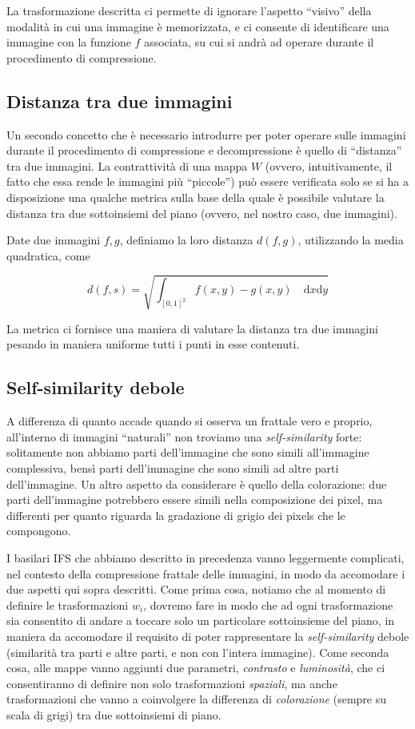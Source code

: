 \documentclass[11pt,a4paper,appendixprefix=true,numbers=noenddot]{scrreprt}
\begin{document}
La trasformazione descritta ci permette di ignorare l'aspetto ``visivo'' della modalità in cui una immagine è memorizzata, e ci consente di identificare una immagine con la funzione $f$ associata, su cui si andrà ad operare durante il procedimento di compressione.

\subsection*{Distanza tra due immagini}

Un secondo concetto che è necessario introdurre per poter operare sulle immagini durante il procedimento di compressione e decompressione è quello di ``distanza'' tra due immagini. La contrattività di una mappa $W$ (ovvero, intuitivamente, il fatto che essa rende le immagini più ``piccole'') può essere verificata solo se si ha a disposizione una qualche metrica sulla base della quale è possibile valutare la distanza tra due sottoinsiemi del piano (ovvero, nel nostro caso, due immagini).

Date due immagini $f, g$, definiamo la loro distanza $d(f, g)$, utilizzando la media quadratica, come

\[
d(f,s) = \sqrt{\int_{[0,1]^2} f(x,y) - g(x,y) \quad \text{d}x\text{d}y }
\]

La metrica ci fornisce una maniera di valutare la distanza tra due immagini pesando in maniera uniforme tutti i punti in esse contenuti.

\subsection*{Self-similarity debole}

A differenza di quanto accade quando si osserva un frattale vero e proprio, all'interno di immagini ``naturali'' non troviamo una \emph{self-similarity} forte: solitamente non abbiamo parti dell'immagine che sono simili all'immagine complessiva, bensì parti dell'immagine che sono simili ad altre parti dell'immagine. Un altro aspetto da considerare è quello della colorazione: due parti dell'immagine potrebbero essere simili nella composizione dei pixel, ma differenti per quanto riguarda la gradazione di grigio dei pixels che le compongono. 

I basilari IFS che abbiamo descritto in precedenza vanno leggermente complicati, nel contesto della compressione frattale delle immagini, in modo da accomodare i due aspetti qui sopra descritti. Come prima cosa, notiamo che al momento di definire le trasformazioni $w_i$, dovremo fare in modo che ad ogni trasformazione sia consentito di andare a toccare solo un particolare sottoinsieme del piano, in maniera da accomodare il requisito di poter rappresentare la \emph{self-similarity} debole (similarità tra parti e altre parti, e non con l'intera immagine). Come seconda cosa, alle mappe vanno aggiunti due parametri, \emph{contrasto} e \emph{luminosità}, che ci consentiranno di definire non solo trasformazioni  \emph{spaziali}, ma anche trasformazioni che vanno a coinvolgere la differenza di \emph{colorazione} (sempre su scala di grigi) tra due sottoinsiemi di piano.
\end{document}
